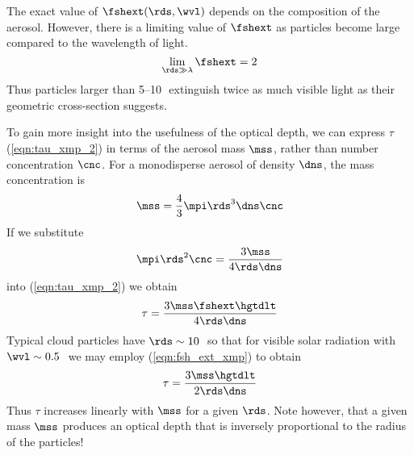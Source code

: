 \documentclass[12pt]{article}
\begin{document}
The exact value of $\fshext(\rds,\wvl)$ depends on the composition of
the aerosol.
However, there is a limiting value of $\fshext$ as particles become
large compared to the wavelength of light. 
\begin{equation}
\lim_{\rds \gg \lambda} \fshext = 2
\label{eqn:fsh_ext_xmp}
\end{equation}
Thus particles larger than 5--10\,\um\ extinguish twice as much visible
light as their geometric cross-section suggests.

To gain more insight into the usefulness of the optical depth, we
can express $\tau$ (\ref{eqn:tau_xmp_2}) in terms of the aerosol mass
$\mss$, rather than number concentration $\cnc$.
For a monodisperse aerosol of density $\dns$, the mass concentration is
\begin{equation}
\mss = \frac{4}{3} \mpi \rds^{3} \dns \cnc
\label{eqn:mss_xmp}
\end{equation}
If we substitute 
\begin{equation}
\mpi \rds^{2} \cnc = \frac{3 \mss}{4 \rds \dns} \nonumber
\end{equation}
into (\ref{eqn:tau_xmp_2}) we obtain
\begin{equation}
\tau = \frac{3 \mss \fshext \hgtdlt}{4 \rds \dns}
\label{eqn:tau_xmp_3}
\end{equation}
Typical cloud particles have $\rds \sim 10$\,\um\ so that for visible
solar radiation with $\wvl \sim 0.5$\,\um\ we may employ
(\ref{eqn:fsh_ext_xmp}) to obtain 
\begin{equation}
\tau = \frac{3 \mss \hgtdlt}{2 \rds \dns}
\label{eqn:tau_xmp_4}
\end{equation}
Thus $\tau$ increases linearly with $\mss$ for a given $\rds$.
Note however, that a given mass $\mss$ produces an optical depth
that is inversely proportional to the radius of the particles!
\end{document}
